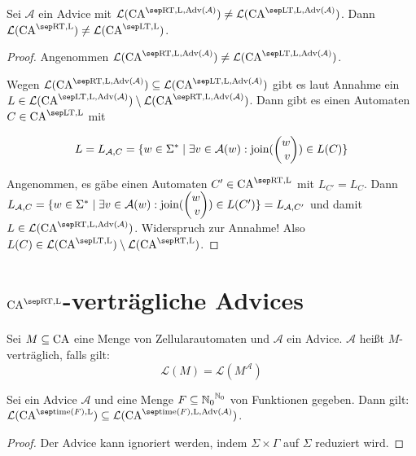 \begin{satz}
    Sei $\mathcal{A}$ ein Advice mit $\CAL{\CART, \CALeft, \orakel({\mathcal{A}})} \neq \CAL{\CALT, \CALeft, \orakel({\mathcal{A}})}$.
    Dann $\CAL{\CART, \CALeft} \neq \CAL{\CALT, \CALeft}$.
\end{satz}
\begin{proof}
    Angenommen $\CAL{\CART, \CALeft, \orakel({\mathcal{A}})} \neq \CAL{\CALT, \CALeft, \orakel({\mathcal{A}})}$.
    
    Wegen $\CAL{\CART, \CALeft, \orakel({\mathcal{A}})} \subseteq \CAL{\CALT, \CALeft, \orakel({\mathcal{A}})}$
    gibt es laut Annahme ein $L \in \CAL{\CALT, \CALeft, \orakel({\mathcal{A}})} \setminus \CAL{\CART, \CALeft, \orakel({\mathcal{A}})}$.
    Dann gibt es einen Automaten $C \in \CAM{\CALT, \CALeft}$ mit
    
    \[
        L = L_{\mathcal{A}, C} = \set{ w \in \Sigma^*}{\exists v \in \mathcal{A}(w): \comb(\Spvek{w; v}) \in L(C)}
    \]
    
    Angenommen, es gäbe einen Automaten $C' \in \CAM{\CART, \CALeft}$ mit $L_{C'} = L_C$.
    Dann $L_{\mathcal{A}, C} = \set{ w \in \Sigma^*}{\exists v \in \mathcal{A}(w): \comb(\Spvek{w; v}) \in L(C')} = L_{\mathcal{A}, C'}$ und damit
    $L \in \CAL{\CART, \CALeft, \orakel({\mathcal{A}})}$.
    Widerspruch zur Annahme! Also $L(C) \in \CAL{\CALT, \CALeft} \setminus \CAL{\CART, \CALeft}$.
\end{proof}


\section{\texorpdfstring{$\CAM{\CART, \CALeft}$}{CA\^RT-L}-verträgliche Advices}

\begin{definition}
    Sei $M \subseteq \textrm{CA}$ eine Menge von Zellularautomaten und $\mathcal{A}$ ein Advice.
    $\mathcal{A}$ heißt $M$-verträglich, falls gilt:
    \[
        \mathcal{L}(M) = \mathcal{L}(M^\mathcal{A})
    \]
\end{definition}

\begin{satz}
    \label{lemmaIgnoriereAdvice}
    Sei ein Advice $\mathcal{A}$ und eine Menge 
    $F \subseteq {\mathbb{N}_0}^{\mathbb{N}_0}$ von Funktionen gegeben.
    Dann gilt: $\mathcal{L}(\CAM{ \mathrm{time}(F), \CALeft }) \subseteq  \mathcal{L}(\CAM{ \mathrm{time}(F), \CALeft, \orakel(\mathcal{A})})$.
\end{satz}
\begin{proof}
    Der Advice kann ignoriert werden, indem $\Sigma \times \Gamma$ auf $\Sigma$ reduziert wird.
\end{proof}







